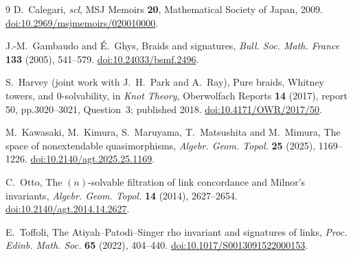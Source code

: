 \documentclass[11pt]{article}
\begin{document}
\begin{thebibliography}{9}
 D.~Calegari, \emph{scl}, MSJ Memoirs \textbf{20},
Mathematical Society of Japan, 2009.
\href{https://doi.org/10.2969/msjmemoirs/020010000}{doi:10.2969/msjmemoirs/020010000}.

 J.-M.~Gambaudo and \'E.~Ghys, Braids and signatures,
\emph{Bull. Soc. Math. France} \textbf{133} (2005), 541--579.
\href{https://doi.org/10.24033/bsmf.2496}{doi:10.24033/bsmf.2496}.

 S.~Harvey (joint work with J.~H.~Park and A.~Ray),
Pure braids, Whitney towers, and $0$-solvability, in
\emph{Knot Theory}, Oberwolfach Reports \textbf{14} (2017),
report 50, pp.3020--3021, Question~3; published 2018.
\href{https://doi.org/10.4171/OWR/2017/50}{doi:10.4171/OWR/2017/50}.

 M.~Kawasaki, M.~Kimura, S.~Maruyama,
T.~Matsushita and M.~Mimura, The space of nonextendable quasimorphisms,
\emph{Algebr. Geom. Topol.} \textbf{25} (2025), 1169--1226.
\href{https://doi.org/10.2140/agt.2025.25.1169}{doi:10.2140/agt.2025.25.1169}.

 C.~Otto, The $(n)$-solvable filtration of link concordance
and Milnor's invariants, \emph{Algebr. Geom. Topol.} \textbf{14}
(2014), 2627--2654.
\href{https://doi.org/10.2140/agt.2014.14.2627}{doi:10.2140/agt.2014.14.2627}.

 E.~Toffoli, The Atiyah--Patodi--Singer rho invariant
and signatures of links, \emph{Proc. Edinb. Math. Soc.} \textbf{65}
(2022), 404--440.
\href{https://doi.org/10.1017/S0013091522000153}{doi:10.1017/S0013091522000153}.
\end{thebibliography}
\end{document}
